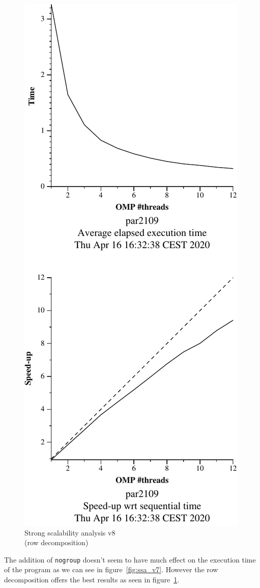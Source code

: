\begin{figure}[H]
\begin{minipage}{0.5\textwidth}
        \includegraphics[width=0.7\linewidth]{plots/v8-crop.pdf}
        \caption{Strong scalability analysis v8 \\ (row decomposition)}
        \label{fig:ssa_v8} 
    \end{minipage}
\end{figure}

The addition of \texttt{nogroup} doesn't seem to have much effect on the execution time of the program as we can
see in figure~\ref{fig:ssa_v7}. However the row decomposition offers the best results as seen in figure~\ref{fig:ssa_v8}.

